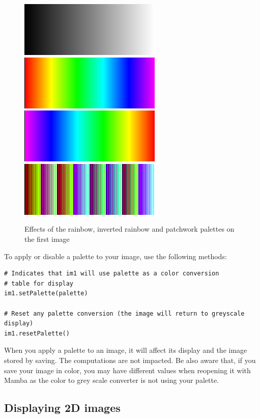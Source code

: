 \documentclass[a4paper,10pt,oneside]{article}
\begin{document}
\begin{figure}
\centering
\includegraphics[scale=0.3]{images/test_ramp.png}
\includegraphics[scale=0.3]{images/test_ramp_r.png}
\includegraphics[scale=0.3]{images/test_ramp_ir.png}
\includegraphics[scale=0.3]{images/test_ramp_p.png}
\caption{Effects of the rainbow, inverted rainbow and patchwork palettes on the first 
image}
\label{fig:palette}
\end{figure}

To apply or disable a palette to your image, use the following methods:

\lstset{language=Python}
\begin{lstlisting}
# Indicates that im1 will use palette as a color conversion
# table for display 
im1.setPalette(palette)

# Reset any palette conversion (the image will return to greyscale display)
im1.resetPalette()
\end{lstlisting}

When you apply a palette to an image, it will affect its display and the image 
stored by saving. The computations are not impacted. Be also aware that, if you 
save your image in color, you may have different values when reopening it with 
Mamba as the color to grey scale converter is not using your palette.

\subsection{Displaying 2D images}
\label{cha:disp_im}
\end{document}

